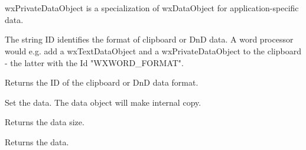 \section{}\label{wxprivatedataobject}

 wxPrivateDataObject is a specialization of wxDataObject for application-specific data.






\label{wxprivatedataobjectwxprivatedataobject}


\label{wxprivatedataobjectdtor}


\label{wxprivatedataobjectgetformat}


\label{wxprivatedataobjectsetid}


The string ID identifies the format of clipboard or DnD data. A word
processor would e.g. add a wxTextDataObject and a wxPrivateDataObject
to the clipboard - the latter with the Id "WXWORD\_FORMAT".

\label{wxprivatedataobjectgetid}


Returns the ID of the clipboard or DnD data format.

\label{wxprivatedataobjectsetdata}


Set the data. The data object will make internal copy.

\label{wxprivatedataobjectgetdatasize}


Returns the data size.

\label{wxprivatedataobjectgetdata}


Returns the data.

